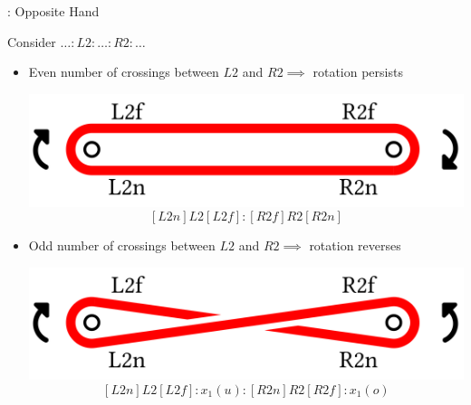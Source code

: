 \begin{frame}{\subsecname: Opposite Hand}
\begin{adjustwidth}{-1.5em}{-1.5em}
Consider $\ldots:L2:\ldots:R2:\ldots$

\begin{itemize}[<+(1)->]
    \item Even number of crossings between $L2$ and $R2\implies$ rotation persists\\
    \begin{center}
    \includegraphics[width=0.5\columnwidth]{figures/diff-even.png}
    $$
    [L2n]L2[L2f]:[R2f]R2[R2n]
    $$
    \end{center}
    \item Odd number of crossings between $L2$ and $R2\implies$ rotation reverses\\
    \begin{center}
    \includegraphics[width=0.5\columnwidth]{figures/diff-odd.png}
    $$
    [L2n]L2[L2f]:x_1(u):[R2n]R2[R2f]:x_1(o)
    $$
    \end{center}
\end{itemize}    
\end{adjustwidth}
\end{frame}

